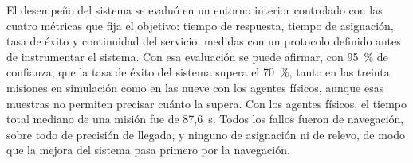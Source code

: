 El desempeño del sistema se evaluó en un entorno interior controlado con las cuatro
métricas que fija el objetivo: tiempo de respuesta, tiempo de asignación, tasa de
éxito y continuidad del servicio, medidas con un protocolo definido antes de
instrumentar el sistema. Con esa evaluación se puede afirmar, con 95~\% de confianza,
que la tasa de éxito del sistema supera el 70~\%, tanto en las treinta misiones en
simulación como en las nueve con los agentes físicos, aunque esas muestras no permiten
precisar cuánto la supera. Con los agentes físicos, el tiempo total mediano de una
misión fue de 87,6~s. Todos los fallos fueron de navegación, sobre todo de precisión
de llegada, y ninguno de asignación ni de relevo, de modo que la mejora del sistema
pasa primero por la navegación.
